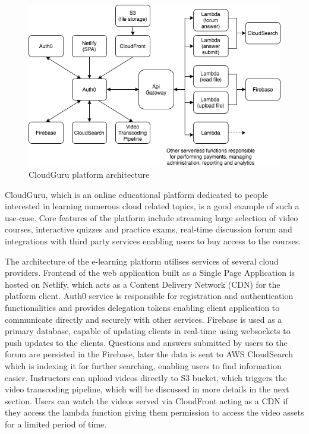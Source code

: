 \begin{figure}[h]
    \centering
    \includegraphics[width=1\textwidth]{assets/02-serverless/CloudGuruArchitecture.png}
    \caption{CloudGuru platform architecture}
    \label{fig:cloudguru-architecture-diagram}
\end{figure}

CloudGuru, which is an online educational platform dedicated to people interested in learning numerous cloud related topics, is a good example of such a use-case. Core features of the platform include streaming large selection of video courses, interactive quizzes and practice exams, real-time discussion forum and integrations with third party services enabling users to buy access to the courses.

The architecture of the e-learning platform utilises services of several cloud providers. Frontend of the web application built as a Single Page Application is hosted on Netlify, which acts as a Content Delivery Network (CDN) for the platform client. Auth0 service is responsible for registration and authentication functionalities and provides delegation tokens enabling client application to communicate directly and securely with other services. Firebase is used as a primary database, capable of updating clients in real-time using websockets to push updates to the clients. Questions and answers submitted by users to the forum are persisted in the Firebase, later the data is sent to AWS CloudSearch which is indexing it for further searching, enabling users to find information easier. Instructors can upload videos directly to S3 bucket, which triggers the video transcoding pipeline, which will be discussed in more details in the next section. Users can watch the videos served via CloudFront acting as a CDN if they access the lambda function giving them permission to access the video assets for a limited period of time.

